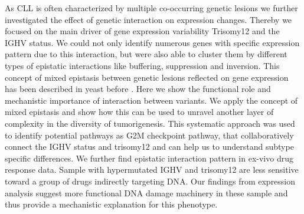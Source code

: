 As CLL is often characterized by multiple co-occurring genetic lesions we further investigated the effect of genetic interaction on expression changes. Thereby we focused on the main driver of gene expression variability Trisomy12 and the IGHV status. We could not only identify numerous genes with specific expression pattern due to this interaction, but were also able to cluster them by different types of epistatic interactions like buffering, suppression and inversion. This concept of mixed epistasis between genetic lesions reflected on gene expression has been described in yeast before \citep{Sameith2015}. Here we show the functional role and mechanistic importance of interaction between variants. We apply the concept of mixed epistasis and show how this can be used to unravel another layer of complexity in the diversity of tumorigenesis. This systematic approach was used to identify potential pathways as G2M checkpoint pathway, that collaboratively connect the IGHV status and trisomy12 and can help us to understand subtype specific differences. We further find epistatic interaction pattern in ex-vivo drug response data. Sample with hypermutated IGHV and trisomy12 are less sensitive toward a group of drugs indirectly targeting DNA. Our findings from expression analysis suggest more functional DNA damage machinery in these sample and thus provide a mechanistic explanation for this phenotype.   
  
